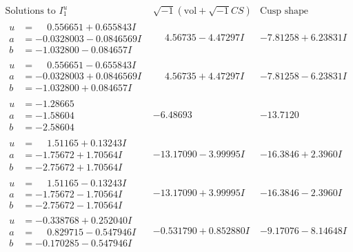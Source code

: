 \documentclass[1p]{elsarticle_modified}
\theoremstyle{definition}
\newcommand{\I}{\sqrt{-1}}
\begin{document}
$$\begin{array}{c|c|c}  
\text{Solutions to }I^u_{1}& \I (\text{vol} + \sqrt{-1}CS) & \text{Cusp shape}\\
 \hline 
\begin{aligned}
u &= \phantom{-}0.556651 + 0.655843 I \\
a &= -0.0328003 - 0.0846569 I \\
b &= -1.032800 - 0.084657 I\end{aligned}
 & \phantom{-}4.56735 - 4.47297 I & -7.81258 + 6.23831 I \\ \hline\begin{aligned}
u &= \phantom{-}0.556651 - 0.655843 I \\
a &= -0.0328003 + 0.0846569 I \\
b &= -1.032800 + 0.084657 I\end{aligned}
 & \phantom{-}4.56735 + 4.47297 I & -7.81258 - 6.23831 I \\ \hline\begin{aligned}
u &= -1.28665\phantom{ +0.000000I} \\
a &= -1.58604\phantom{ +0.000000I} \\
b &= -2.58604\phantom{ +0.000000I}\end{aligned}
 & -6.48693\phantom{ +0.000000I} & -13.7120\phantom{ +0.000000I} \\ \hline\begin{aligned}
u &= \phantom{-}1.51165 + 0.13243 I \\
a &= -1.75672 + 1.70564 I \\
b &= -2.75672 + 1.70564 I\end{aligned}
 & -13.17090 - 3.99995 I & -16.3846 + 2.3960 I \\ \hline\begin{aligned}
u &= \phantom{-}1.51165 - 0.13243 I \\
a &= -1.75672 - 1.70564 I \\
b &= -2.75672 - 1.70564 I\end{aligned}
 & -13.17090 + 3.99995 I & -16.3846 - 2.3960 I \\ \hline\begin{aligned}
u &= -0.338768 + 0.252040 I \\
a &= \phantom{-}0.829715 - 0.547946 I \\
b &= -0.170285 - 0.547946 I\end{aligned}
 & -0.531790 + 0.852880 I & -9.17076 - 8.14648 I \\ \hline\begin{aligned}

\end{aligned}
\end{array}$$
\end{document}
